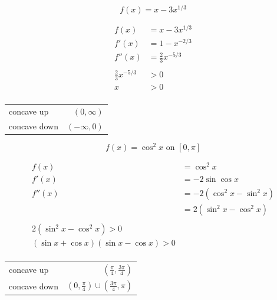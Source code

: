 \documentclass[fleqn,addpoints]{exam}
\begin{document}
\begin{questions}
\begin{solution}[8 cm]
\end{solution}

\question[5]
\[
  f(x) = x - 3x^{1/3}
\]

\begin{solution}[8 cm]
\begin{align*}
  f(x) &= x - 3x^{1/3} \\
  f'(x) &= 1 - x^{-2/3} \\
  f''(x) &= \frac{2}{3} x^{-5/3} \\
\\
  \frac{2}{3} x^{-5/3} &> 0 \\
  x &> 0 \\
\end{align*}

\begin{tabular}{lr}
\toprule
concave up   & $(0, \infty)$ \\
concave down & $(-\infty, 0)$ \\
\bottomrule
\end{tabular}

\end{solution}


\question[8]
\label{concavity:last}
\[
  f(x) = \cos^2 x \text{ on } [0, \pi]
\]

\begin{solution}
\begin{align*}
  f(x) &= \cos^2 x \\
  f'(x)  &= -2 \sin \cos x \\
  f''(x) &= -2 (\cos^2 x - \sin^2 x) \\
         &= 2 (\sin^2 x - \cos^2 x) \\
\\
  2(\sin^2 x - \cos^2 x) > 0 \\
  (\sin x + \cos x) (\sin x - \cos x) > 0 \\
\end{align*}

\begin{tabular}{lr}
\toprule
concave up   & $\left( \frac{\pi}{4}, \frac{3 \pi}{4} \right)$ \\
concave down & $\left(0, \frac{\pi}{4} \right) \cup \left(\frac{3 \pi}{4}, \pi \right)$ \\
\bottomrule
\end{tabular}


\end{solution}
\end{questions}
\end{document}
